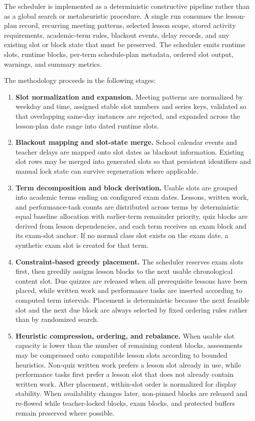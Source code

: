 \documentclass[12pt]{article}
\begin{document}
The scheduler is implemented as a deterministic constructive pipeline rather than
as a global search or metaheuristic procedure. A single run consumes the
lesson-plan record, recurring meeting patterns, selected lesson scope, stored
activity requirements, academic-term rules, blackout events, delay records, and
any existing slot or block state that must be preserved. The scheduler emits
runtime slots, runtime blocks, per-term schedule-plan metadata, ordered slot
output, warnings, and summary metrics.

The methodology proceeds in the following stages:
\begin{enumerate}
\item \textbf{Slot normalization and expansion.} Meeting patterns are normalized
by weekday and time, assigned stable slot numbers and series keys, validated so
that overlapping same-day instances are rejected, and expanded across the
lesson-plan date range into dated runtime slots.
\item \textbf{Blackout mapping and slot-state merge.} School calendar events and
teacher delays are mapped onto slot dates as blackout information. Existing slot
rows may be merged into generated slots so that persistent identifiers and manual
lock state can survive regeneration where applicable.
\item \textbf{Term decomposition and block derivation.} Usable slots are grouped
into academic terms ending on configured exam dates. Lessons, written work, and
performance-task counts are distributed across terms by deterministic equal
baseline allocation with earlier-term remainder priority, quiz blocks are
derived from lesson dependencies, and each term receives an exam block and its
exam-slot anchor. If no normal class slot exists on the exam date, a synthetic
exam slot is created for that term.
\item \textbf{Constraint-based greedy placement.} The scheduler reserves exam
slots first, then greedily assigns lesson blocks to the next usable chronological
content slot. Due quizzes are released when all prerequisite lessons have been
placed, while written work and performance tasks are inserted according to
computed term intervals. Placement is deterministic because the next feasible
slot and the next due block are always selected by fixed ordering rules rather
than by randomized search.
\item \textbf{Heuristic compression, ordering, and rebalance.} When usable slot
capacity is lower than the number of remaining content blocks, assessments may be
compressed onto compatible lesson slots according to bounded heuristics.
Non-quiz written work prefers a lesson slot already in use, while performance
tasks first prefer a lesson slot that does not already contain written work.
After placement, within-slot order is normalized for display stability. When
availability changes later, non-pinned blocks are released and re-flowed while
teacher-locked blocks, exam blocks, and protected buffers remain preserved where
possible.
\end{enumerate}
\end{document}

